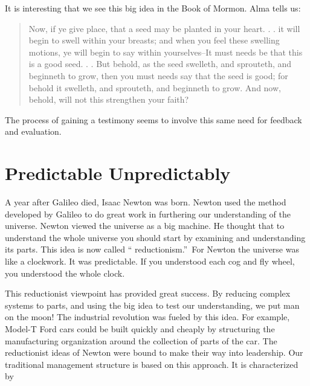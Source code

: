 \documentclass{article}
\begin{document}
It is interesting that we see this big idea in the Book of Mormon. Alma
tells us:

\begin{quotation}
Now, if ye give place, that a seed may be planted in your heart. . . it will
begin to swell within your breasts; and when you feel these swelling
motions, ye will begin to say within yourselves--It must needs be that this
is a good seed. . . But behold, as the seed swelleth, and sprouteth, and
beginneth to grow, then you must needs say that the seed is good; for behold
it swelleth, and sprouteth, and beginneth to grow. And now, behold, will not
this strengthen your faith?
\end{quotation}

The process of gaining a testimony seems to involve this same need for
feedback and evaluation.

\section{Predictable Unpredictably}

A year after Galileo died, Isaac Newton was born. Newton used the method
developed by Galileo to do great work in furthering our understanding of the
universe. Newton viewed the universe as a big machine. He thought that to
understand the whole universe you should start by examining and
understanding its parts. This idea is now called \textquotedblleft
reductionism.\textquotedblright\ For Newton the universe was like a
clockwork. It was predictable. If you understood each cog and fly wheel, you
understood the whole clock.

This reductionist viewpoint has provided great success. By reducing complex
systems to parts, and using the big idea to test our understanding, we put
man on the moon! The industrial revolution was fueled by this idea. For
example, Model-T Ford cars could be built quickly and cheaply by structuring
the manufacturing organization around the collection of parts of the car.
The reductionist ideas of Newton were bound to make their way into
leadership. Our traditional management structure is based on this approach.
It is characterized by
\end{document}
